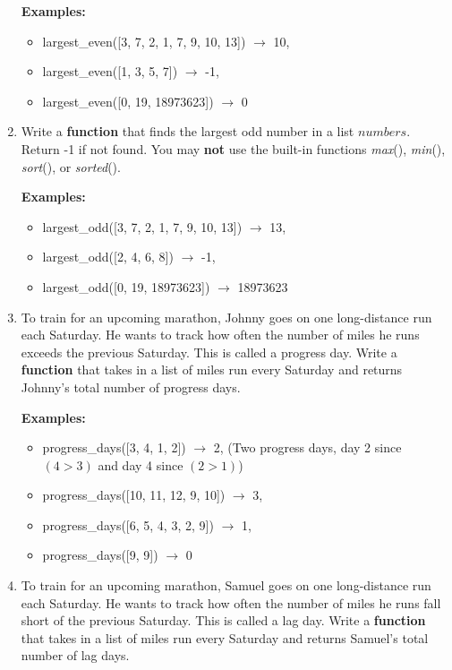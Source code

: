 \documentclass{article}
\begin{document}
\begin{enumerate}
		\textbf{Examples:}		
		\begin{itemize}
			\item  largest\_even([3, 7, 2, 1, 7, 9, 10, 13]) $\rightarrow$ 10,
			\item  largest\_even([1, 3, 5, 7]) $\rightarrow$ -1,
			\item  largest\_even([0, 19, 18973623]) $\rightarrow$ 0
		\end{itemize}

	\item 
		Write a \textbf{function} that finds the largest odd number in a list $numbers$. Return -1 if not found. 
		You may \textbf{not} use the built-in functions \textit{max}(), \textit{min}(), \textit{sort}(), or \textit{sorted}().

		\textbf{Examples:}		
		\begin{itemize}
			\item  largest\_odd([3, 7, 2, 1, 7, 9, 10, 13]) $\rightarrow$ 13,
			\item  largest\_odd([2, 4, 6, 8]) $\rightarrow$ -1,
			\item  largest\_odd([0, 19, 18973623]) $\rightarrow$ 18973623
		\end{itemize}

	\item
		To train for an upcoming marathon, Johnny goes on one long-distance run each Saturday. 
		He wants to track how often the number of miles he runs exceeds the previous Saturday. 
		This is called a progress day. Write a \textbf{function} that takes in a list of miles 
		run every Saturday and returns Johnny's total number of progress days.

		\textbf{Examples:}		
		\begin{itemize}
			\item  progress\_days([3, 4, 1, 2]) $\rightarrow$ 2, 
				(Two progress days, day 2 since $(4>3)$ and day 4 since $(2>1)$)
			\item  progress\_days([10, 11, 12, 9, 10]) $\rightarrow$ 3, 
			\item  progress\_days([6, 5, 4, 3, 2, 9]) $\rightarrow$ 1, 
			\item  progress\_days([9, 9]) $\rightarrow$ 0
		\end{itemize}

	\item
		To train for an upcoming marathon, Samuel goes on one long-distance run each Saturday. 
		He wants to track how often the number of miles he runs fall short of the previous Saturday. 
		This is called a lag day. Write a \textbf{function} that takes in a list of miles 
		run every Saturday and returns Samuel's total number of lag days.


\end{enumerate}
\end{document}
